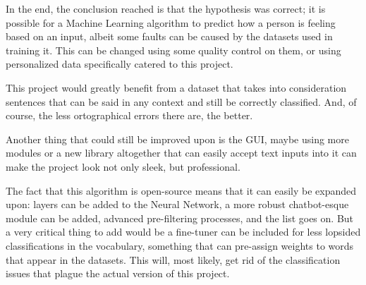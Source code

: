 \documentclass[review]{elsarticle} %
\begin{document}
In the end, the conclusion reached is that the hypothesis was correct; it is possible for a Machine Learning algorithm to predict how a person is feeling based on an input, albeit some faults can be caused by the datasets used in training it. This can be changed using some quality control on them, or using personalized data specifically catered to this project.

This project would greatly benefit from a dataset that takes into consideration sentences that can be said in any context and still be correctly classified. And, of course, the less ortographical errors there are, the better.

Another thing that could still be improved upon is the GUI, maybe using more modules or a new library altogether that can easily accept text inputs into it can make the project look not only sleek, but professional.

The fact that this algorithm is open-source means that it can easily be expanded upon: layers can be added to the Neural Network, a more robust chatbot-esque module can be added, advanced pre-filtering processes, and the list goes on. But a very critical thing to add would be a fine-tuner can be included for less lopsided classifications in the vocabulary, something that can pre-assign weights to words that appear in the datasets. This will, most likely, get rid of the classification issues that plague the actual version of this project.

%

\end{document}
